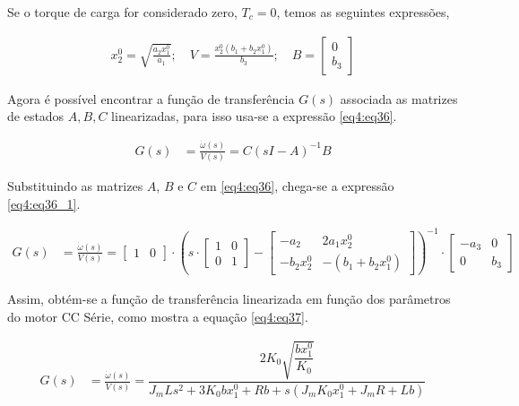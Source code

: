 Se o torque de carga for considerado zero, $T_c = 0$, temos as seguintes expressões,

\begin{align}
     x_2^0 = \sqrt{\frac{a_2x_1^0}{a_1}}; \quad
         V = \frac{x_2^0(b_1+b_2x_1^0)}{b_3}; \quad
         B = \begin{bmatrix}
        0\\
        b_3
\end{bmatrix}  \label{eq4:eq35}
\end{align}

Agora é possível encontrar a função de transferência $G(s)$ associada as matrizes de estados $A, B, C$ linearizadas, para isso usa-se a expressão \ref{eq4:eq36}.


\begin{align}
    G(s) &= \frac{\dot{\omega}(s)}{V(s)} = C(sI-A)^{-1}B     \label{eq4:eq36}
\end{align}

Substituindo as matrizes $A$, $B$ e $C$ em \ref{eq4:eq36}, chega-se a expressão \ref{eq4:eq36_1}.

\begin{align}
    G(s) &= \frac{\dot{\omega}(s)}{V(s)} = \begin{bmatrix}
        1 & 0
\end{bmatrix} \cdot \left(s \cdot \begin{bmatrix}
    1  & 0\\
    0  & 1
\end{bmatrix}-\begin{bmatrix}
    -a_2       &   2a_1x_2^0\\
    -b_2x_2^0  & -(b_1+b_2x_1^0)
\end{bmatrix}\right)^{-1} \cdot \begin{bmatrix}
    -a_3       &   0\\
    0  & b_3
\end{bmatrix}     \label{eq4:eq36_1}
\end{align}

Assim, obtém-se a função de transferência linearizada em função dos parâmetros do motor CC Série, como mostra a equação \ref{eq4:eq37}.



\begin{align}
    G(s) &= \frac{\dot{\omega}(s)}{V(s)} = \dfrac{2 K_{0} \sqrt{\dfrac{b x^{0}_{1}}{K_{0}}}}{J_m L s^{2} + 3 K_{0} b x^{0}_{1} + R b + s \left(J_m K_{0} x^{0}_{1} + J_m R + L b\right)}     \label{eq4:eq37}
\end{align}

